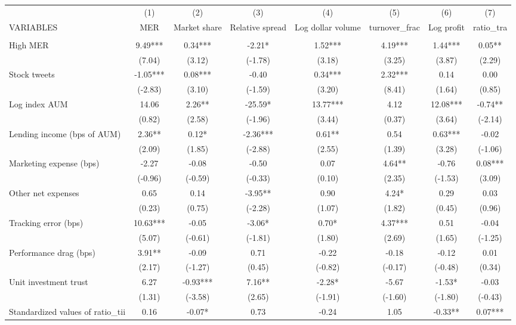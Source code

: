 \documentclass[]{article}
\begin{document}
\begin{tabular}{lccccccc} \hline
 & (1) & (2) & (3) & (4) & (5) & (6) & (7) \\
VARIABLES & MER & Market share & Relative spread & Log dollar volume & turnover\_frac & Log profit & ratio\_tra \\ \hline
 &  &  &  &  &  &  &  \\
High MER & 9.49*** & 0.34*** & -2.21* & 1.52*** & 4.19*** & 1.44*** & 0.05** \\
 & (7.04) & (3.12) & (-1.78) & (3.18) & (3.25) & (3.87) & (2.29) \\
Stock tweets & -1.05*** & 0.08*** & -0.40 & 0.34*** & 2.32*** & 0.14 & 0.00 \\
 & (-2.83) & (3.10) & (-1.59) & (3.20) & (8.41) & (1.64) & (0.85) \\
Log index AUM & 14.06 & 2.26** & -25.59* & 13.77*** & 4.12 & 12.08*** & -0.74** \\
 & (0.82) & (2.58) & (-1.96) & (3.44) & (0.37) & (3.64) & (-2.14) \\
Lending income (bps of AUM) & 2.36** & 0.12* & -2.36*** & 0.61** & 0.54 & 0.63*** & -0.02 \\
 & (2.09) & (1.85) & (-2.88) & (2.55) & (1.39) & (3.28) & (-1.06) \\
Marketing expense (bps) & -2.27 & -0.08 & -0.50 & 0.07 & 4.64** & -0.76 & 0.08*** \\
 & (-0.96) & (-0.59) & (-0.33) & (0.10) & (2.35) & (-1.53) & (3.09) \\
Other net expenses & 0.65 & 0.14 & -3.95** & 0.90 & 4.24* & 0.29 & 0.03 \\
 & (0.23) & (0.75) & (-2.28) & (1.07) & (1.82) & (0.45) & (0.96) \\
Tracking error (bps) & 10.63*** & -0.05 & -3.06* & 0.70* & 4.37*** & 0.51 & -0.04 \\
 & (5.07) & (-0.61) & (-1.81) & (1.80) & (2.69) & (1.65) & (-1.25) \\
Performance drag (bps) & 3.91** & -0.09 & 0.71 & -0.22 & -0.18 & -0.12 & 0.01 \\
 & (2.17) & (-1.27) & (0.45) & (-0.82) & (-0.17) & (-0.48) & (0.34) \\
Unit investment trust & 6.27 & -0.93*** & 7.16** & -2.28* & -5.67 & -1.53* & -0.03 \\
 & (1.31) & (-3.58) & (2.65) & (-1.91) & (-1.60) & (-1.80) & (-0.43) \\
Standardized values of ratio\_tii & 0.16 & -0.07* & 0.73 & -0.24 & 1.05 & -0.33** & 0.07*** \\

\end{tabular}
\end{document}
